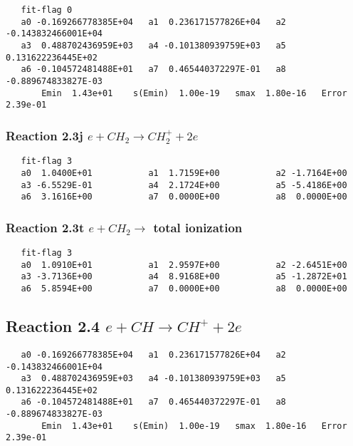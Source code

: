 \documentclass[12pt]{article}
\begin{document}
\begin{small}\begin{verbatim} 
   fit-flag 0
   a0 -0.169266778385E+04   a1  0.236171577826E+04   a2 -0.143832466001E+04
   a3  0.488702436959E+03   a4 -0.101380939759E+03   a5  0.131622236445E+02
   a6 -0.104572481488E+01   a7  0.465440372297E-01   a8 -0.889674833827E-03
       Emin  1.43e+01    s(Emin)  1.00e-19   smax  1.80e-16   Error  2.39e-01
\end{verbatim}\end{small}
 
 
\subsubsection{
Reaction 2.3j      $e + CH_{2} \rightarrow CH_{2}^{+} + 2e $
}
 
\begin{small}\begin{verbatim} 
   fit-flag 3
   a0  1.0400E+01           a1  1.7159E+00           a2 -1.7164E+00 
   a3 -6.5529E-01           a4  2.1724E+00           a5 -5.4186E+00 
   a6  3.1616E+00           a7  0.0000E+00           a8  0.0000E+00
\end{verbatim}\end{small}
 
 
\subsubsection{
Reaction 2.3t      $e + CH_{2} \rightarrow$ total ionization 
}
 
\begin{small}\begin{verbatim} 
   fit-flag 3
   a0  1.0910E+01           a1  2.9597E+00           a2 -2.6451E+00 
   a3 -3.7136E+00           a4  8.9168E+00           a5 -1.2872E+01 
   a6  5.8594E+00           a7  0.0000E+00           a8  0.0000E+00
\end{verbatim}\end{small}
 
 
\subsection{
Reaction 2.4      $e + CH \rightarrow  CH^+ +2e$
}
 
\begin{small}\begin{verbatim} 
   a0 -0.169266778385E+04   a1  0.236171577826E+04   a2 -0.143832466001E+04
   a3  0.488702436959E+03   a4 -0.101380939759E+03   a5  0.131622236445E+02
   a6 -0.104572481488E+01   a7  0.465440372297E-01   a8 -0.889674833827E-03
       Emin  1.43e+01    s(Emin)  1.00e-19   smax  1.80e-16   Error  2.39e-01
 \end{verbatim}\end{small}
\end{document}

